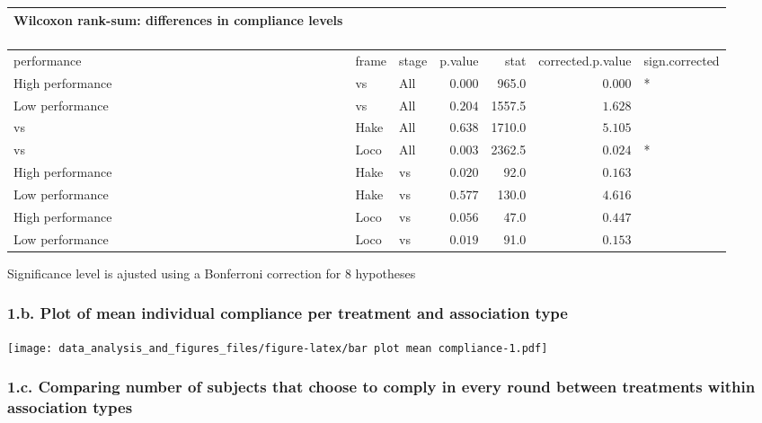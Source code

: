 \documentclass[
]{article}
\begin{document}
\captionsetup[table]{labelformat=empty,skip=1pt}
\begin{longtable}{lllrrrl}
\caption*{
\large Wilcoxon rank-sum: differences in compliance levels\\ 
\small \\ 
} \\ 
\toprule
performance & frame & stage & p.value & stat & corrected.p.value & sign.corrected \\ 
\midrule
High performance & vs & All & $0.000$ & 965.0 & $0.000$ & * \\ 
Low performance & vs & All & $0.204$ & 1557.5 & $1.628$ &  \\ 
vs & Hake & All & $0.638$ & 1710.0 & $5.105$ &  \\ 
vs & Loco & All & $0.003$ & 2362.5 & $0.024$ & * \\ 
High performance & Hake & vs & $0.020$ & 92.0 & $0.163$ &  \\ 
Low performance & Hake & vs & $0.577$ & 130.0 & $4.616$ &  \\ 
High performance & Loco & vs & $0.056$ & 47.0 & $0.447$ &  \\ 
Low performance & Loco & vs & $0.019$ & 91.0 & $0.153$ &  \\ 
\bottomrule
\end{longtable}
\begin{minipage}{\linewidth}
Significance level is ajusted using a Bonferroni correction for 8 hypotheses\\ 
\end{minipage}

\hypertarget{b.-plot-of-mean-individual-compliance-per-treatment-and-association-type}{%
\subsubsection{1.b. Plot of mean individual compliance per treatment and
association
type}\label{b.-plot-of-mean-individual-compliance-per-treatment-and-association-type}}

\texttt{[image: data\_analysis\_and\_figures\_files/figure-latex/bar plot mean compliance-1.pdf]}

\hypertarget{c.-comparing-number-of-subjects-that-choose-to-comply-in-every-round-between-treatments-within-association-types}{%
\subsubsection{1.c. Comparing number of subjects that choose to comply
in every round between treatments within association
types}\label{c.-comparing-number-of-subjects-that-choose-to-comply-in-every-round-between-treatments-within-association-types}}
\end{document}
